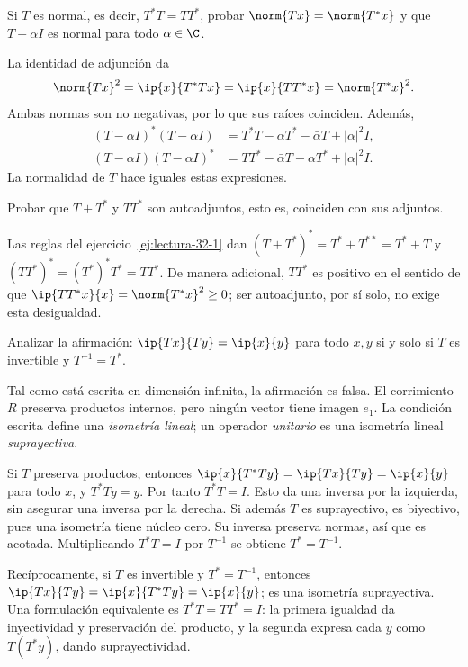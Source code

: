 \begin{ejercicio}\label{ej:lectura-32-2}
Si $T$ es normal, es decir, $T^*T=TT^*$, probar $\norm{Tx}=\norm{T^*x}$ y que $T-\alpha I$ es normal para todo $\alpha\in\C$.
\end{ejercicio}
\begin{solucion}
La identidad de adjunción da
\[
 \norm{Tx}^{2}=\ip{x}{T^*Tx}=\ip{x}{TT^*x}=\norm{T^*x}^{2}.
\]
Ambas normas son no negativas, por lo que sus raíces coinciden. Además,
\begin{align*}
 (T-\alpha I)^*(T-\alpha I)
 &=T^*T-\alpha T^*-\bar\alpha T+|\alpha|^2I,\\
 (T-\alpha I)(T-\alpha I)^*
 &=TT^*-\bar\alpha T-\alpha T^*+|\alpha|^2I.
\end{align*}
La normalidad de $T$ hace iguales estas expresiones.
\end{solucion}

\begin{ejercicio}\label{ej:lectura-32-3}
Probar que $T+T^*$ y $TT^*$ son autoadjuntos, esto es, coinciden con sus adjuntos.
\end{ejercicio}
\begin{solucion}
Las reglas del ejercicio~\ref{ej:lectura-32-1} dan $(T+T^*)^*=T^*+T^{**}=T^*+T$ y $(TT^*)^*=(T^*)^*T^*=TT^*$. De manera adicional, $TT^*$ es positivo en el sentido de que $\ip{TT^*x}{x}=\norm{T^*x}^{2}\geq0$; ser autoadjunto, por sí solo, no exige esta desigualdad.
\end{solucion}

\begin{ejercicio}\label{ej:lectura-32-4}
Analizar la afirmación: $\ip{Tx}{Ty}=\ip{x}{y}$ para todo $x,y$ si y solo si $T$ es invertible y $T^{-1}=T^*$.
\end{ejercicio}
\begin{solucion}
Tal como está escrita en dimensión infinita, la afirmación es falsa. El corrimiento $R$ preserva productos internos, pero ningún vector tiene imagen $e_1$. La condición escrita define una \emph{isometría lineal}; un operador \emph{unitario} es una isometría lineal \emph{suprayectiva}.

Si $T$ preserva productos, entonces $\ip{x}{T^*Ty}=\ip{Tx}{Ty}=\ip{x}{y}$ para todo $x$, y $T^*Ty=y$. Por tanto $T^*T=I$. Esto da una inversa por la izquierda, sin asegurar una inversa por la derecha. Si además $T$ es suprayectivo, es biyectivo, pues una isometría tiene núcleo cero. Su inversa preserva normas, así que es acotada. Multiplicando $T^*T=I$ por $T^{-1}$ se obtiene $T^*=T^{-1}$.

Recíprocamente, si $T$ es invertible y $T^*=T^{-1}$, entonces
$\ip{Tx}{Ty}=\ip{x}{T^*Ty}=\ip{x}{y}$; es una isometría suprayectiva. Una formulación equivalente es $T^*T=TT^*=I$: la primera igualdad da inyectividad y preservación del producto, y la segunda expresa cada $y$ como $T(T^*y)$, dando suprayectividad.
\end{solucion}

